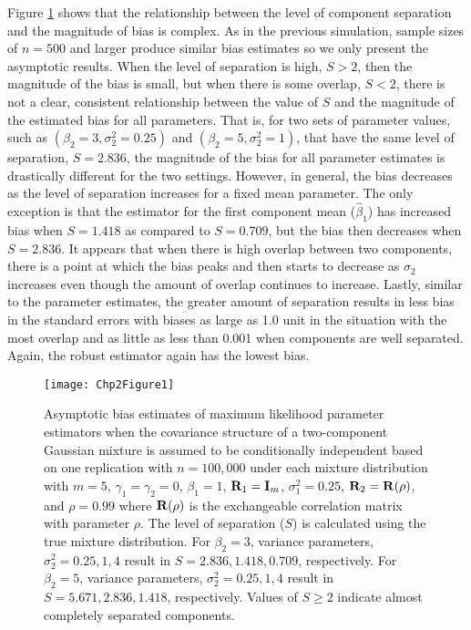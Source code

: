 Figure \ref{fig:2-1} shows that the relationship between the level of component separation and the magnitude of bias is complex. As in the previous simulation, sample sizes of $n=500$ and larger produce similar bias estimates so we only present the asymptotic results. When the level of separation is high, $S>2$, then the magnitude of the bias is small, but when there is some overlap, $S<2$, there is not a clear, consistent relationship between the value of $S$ and the magnitude of the estimated bias for all parameters. That is, for two sets of parameter values, such as $(\beta_{2}=3,\sigma^{2}_{2}=0.25)$ and $(\beta_{2}=5,\sigma^{2}_{2}=1)$, that have the same level of separation, $S = 2.836$, the magnitude of the bias for all parameter estimates is drastically different for the two settings. However, in general, the bias decreases as the level of separation increases for a fixed mean parameter. The only exception is that the estimator for the first component mean ($\widehat{\beta}_{1}$) has increased bias when $S=1.418$ as compared to $S=0.709$, but the bias then decreases when $S=2.836$. It appears that when there is high overlap between two components, there is a point at which the bias peaks and then starts to decrease as $\sigma_2$ increases even though the amount of overlap continues to increase. Lastly, similar to the parameter estimates, the greater amount of separation results in less bias in the standard errors with biases as large as 1.0 unit in the situation with the most overlap and as little as less than 0.001 when components are well separated. Again, the robust estimator again has the lowest bias. 
\begin{figure}
\begin{center}
\texttt{[image: Chp2Figure1]}
\end{center}
\caption{Asymptotic bias estimates of maximum likelihood parameter estimators when the covariance structure of a two-component Gaussian mixture is assumed to be conditionally independent based on one replication with $n=100,000$ under each mixture distribution with $m=5$, $\gamma_1=\gamma_2=0$, $\beta_{1}=1$, $\mathbf R_1=\mathbf I_{m}$, $\sigma_1^{2}=0.25$,  $\mathbf R_2=\mathbf R(\rho)$, and $\rho=0.99$ where $\mathbf R(\rho)$ is the exchangeable correlation matrix with parameter $\rho$. The level of separation ($S$) is calculated using the true mixture distribution. For $\beta_{2} = 3$, variance parameters, $\sigma_{2}^{2}=0.25,1,4$ result in $S=2.836,1.418, 0.709$, respectively. For $\beta_{2} = 5$, variance parameters, $\sigma_{2}^{2}=0.25,1,4$ result in $S=5.671,2.836,1.418$, respectively. Values of $S\geq 2$ indicate almost completely separated components.}
\label{fig:2-1}
\end{figure}

